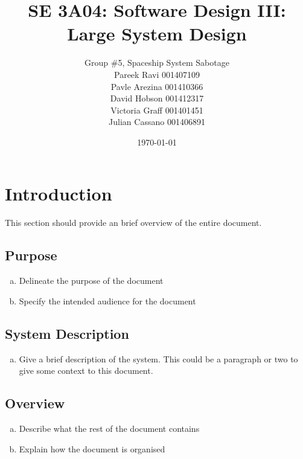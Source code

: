 \documentclass[12pt, titlepage]{article}
\title{SE 3A04: Software Design III: Large System Design}
\author{Group \#5, Spaceship System Sabotage %
		\\Pareek Ravi 001407109
		\\Pavle Arezina 001410366
		\\David Hobson 001412317
		\\Victoria Graff 001401451
		\\Julian Cassano 001406891
}
\date{\today}
\begin{document}
\maketitle	
{}
\tableofcontents
\listoftables
\listoffigures
\newpage

\section{Introduction}
\label{sec:introduction}

This section should provide an brief overview of the entire document.

\subsection{Purpose}
\label{sub:purpose}
\begin{enumerate}[a)]
	\item Delineate the purpose of the document
	\item Specify the intended audience for the document
\end{enumerate}

\subsection{System Description}
\label{sub:system_description}
\begin{enumerate}[a)]
	\item Give a brief description of the system. This could be a paragraph or two to give some context to this document.
\end{enumerate}

\subsection{Overview}
\label{sub:overview}
\begin{enumerate}[a)]
	\item Describe what the rest of the document contains 
	\item Explain how the document is organised
\end{enumerate}

\end{document}
